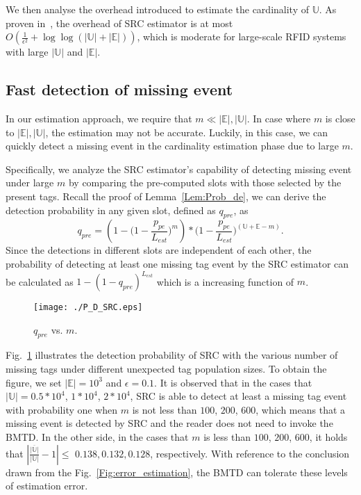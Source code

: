 \documentclass[10pt, twocolumn]{IEEEtran}
\begin{document}
We then analyse the overhead introduced to estimate the cardinality of $\mathbb{U}$. As proven in~\cite{chen2013understanding}, the overhead of SRC estimator is at most $O(\frac{1}{\epsilon^2}+\log\log(|\mathbb{U}|+|\mathbb{E}|))$, which is moderate for large-scale RFID systems with large $|\mathbb{U}|$ and $|\mathbb{E}|$.

\subsection{Fast detection of missing event}

In our estimation approach, we require that $m\ll |\mathbb{E}|, |\mathbb{U}|$. In case where $m$ is close to $|\mathbb{E}|, |\mathbb{U}|$, the estimation may not be accurate. Luckily, in this case, we can quickly detect a missing event in the cardinality estimation phase due to large $m$.

Specifically, we analyze the SRC estimator's capability of detecting missing event under large $m$ by comparing the pre-computed slots with those selected by the present tags. Recall the proof of Lemma~\ref{Lem:Prob_de}, we can derive the detection probability in any given slot, defined as $q_{pre}$, as
\begin{equation}
q_{pre} = \left(1-\big(1-\frac{p_{pe}}{L_{est}}\big)^{m}\right)*
            \Big(1-\frac{p_{pe}}{L_{est}}\Big)^{(\mathbb{U}+\mathbb{E}-m)}.
\end{equation}
Since the detections in different slots are independent of each other, the probability of detecting at least one missing tag event by the SRC estimator can be calculated as $1-(1-q_{pre})^{L_{est}}$ which is a increasing function of $m$.

\begin{figure}[htbp]
\centering
\texttt{[image: ./P\_D\_SRC.eps]}
\caption{$q_{pre}$ vs. $m$.}
\label{Fig:SRC}
\end{figure}

Fig.~\ref{Fig:SRC} illustrates the detection probability of SRC with the various number of missing tags under different unexpected tag population sizes. To obtain the figure, we set $|\mathbb{E}|=10^3$ and $\epsilon=0.1$. It is observed that in the cases that $|\mathbb{U}|=0.5*10^4$, $1*10^4$, $2*10^4$, SRC is able to detect at least a missing tag event with probability one when $m$ is not less than $100$, $200$, $600$, which means that a missing event is detected by SRC and the reader does not need to invoke the BMTD. In the other side, in the cases that $m$ is less than $100$, $200$, $600$, it holds that $|{\frac{\overline{|\mathbb{U}|}}{|\mathbb{U}|}-1}|$$\le$ $0.138,0.132,0.128$, respectively. With reference to the conclusion drawn from the Fig.~\ref{Fig:error_estimation}, the BMTD can tolerate these levels of estimation error.
\end{document}
